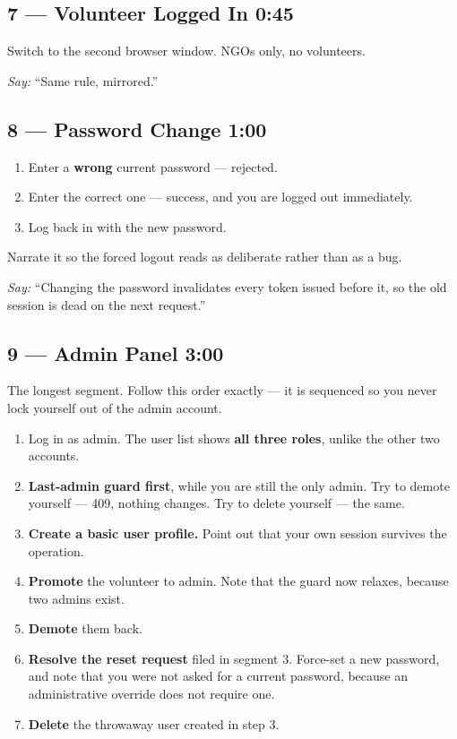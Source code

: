 \documentclass[11pt,letterpaper]{article}
\newcommand{\sayit}[1]{%
  \begin{mdframed}[linecolor=glrule,linewidth=0.8pt,
                   backgroundcolor=white,
                   innertopmargin=6pt,innerbottommargin=6pt,
                   innerleftmargin=8pt,innerrightmargin=8pt,
                   skipabove=6pt,skipbelow=6pt]
  \textit{Say:} ``#1''
  \end{mdframed}}
\begin{document}
\subsection*{7 --- Volunteer Logged In \hfill \normalfont\small 0:45}

Switch to the second browser window. NGOs only, no volunteers.

\sayit{Same rule, mirrored.}

\subsection*{8 --- Password Change \hfill \normalfont\small 1:00}

\begin{enumerate}
  \item Enter a \textbf{wrong} current password --- rejected.
  \item Enter the correct one --- success, and you are logged out
        immediately.
  \item Log back in with the new password.
\end{enumerate}

Narrate it so the forced logout reads as deliberate rather than as a bug.

\sayit{Changing the password invalidates every token issued before it, so the
old session is dead on the next request.}

\subsection*{9 --- Admin Panel \hfill \normalfont\small 3:00}

The longest segment. Follow this order exactly --- it is sequenced so you
never lock yourself out of the admin account.

\begin{enumerate}
  \item Log in as admin. The user list shows \textbf{all three roles},
        unlike the other two accounts.
  \item \textbf{Last-admin guard first}, while you are still the only admin.
        Try to demote yourself --- 409, nothing changes. Try to delete
        yourself --- the same.
  \item \textbf{Create a basic user profile.} Point out that your own
        session survives the operation.
  \item \textbf{Promote} the volunteer to admin. Note that the guard now
        relaxes, because two admins exist.
  \item \textbf{Demote} them back.
  \item \textbf{Resolve the reset request} filed in segment 3. Force-set a
        new password, and note that you were not asked for a current
        password, because an administrative override does not require one.
  \item \textbf{Delete} the throwaway user created in step 3.
\end{enumerate}
\end{document}
